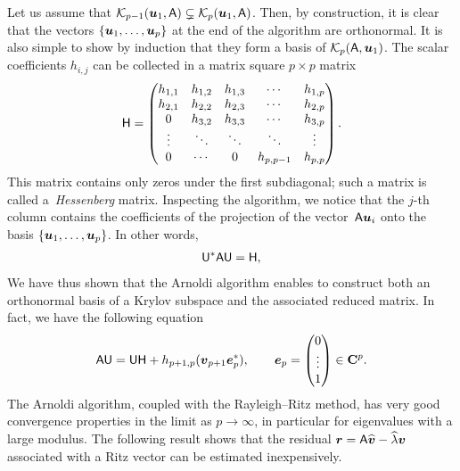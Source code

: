 Let us assume that $\mathcal K_{p-1}(\mathbf{\boldsymbol{u}}_1, \mathsf A) \subsetneq \mathcal K_p(\mathbf{\boldsymbol{u}}_1, \mathsf A)$.
Then, by construction,
it is clear that the vectors $\{\mathbf{\boldsymbol{u}}_1, \dotsc, \mathbf{\boldsymbol{u}}_p\}$ at the end of the algorithm are orthonormal.
It is also simple to show by induction that they form a basis of $\mathcal K_p(\mathsf A, \mathbf{\boldsymbol{u}}_1)$.
The scalar coefficients $h_{i,j}$ can be collected in a matrix square $p \times p$ matrix
\[
    \mathsf H
    =
    \begin{pmatrix}
        h_{1,1} & h_{1,2} & h_{1,3} & \cdots  & h_{1,p} \\
        h_{2,1} & h_{2,2} & h_{2,3} & \cdots  & h_{2,p} \\
        0       & h_{3,2} & h_{3,3} & \cdots  & h_{3,p} \\
        \vdots  & \ddots  & \ddots  & \ddots  & \vdots  \\
        0       & \cdots  & 0     & h_{p,p-1} & h_{p,p}
    \end{pmatrix}.
\]
This matrix contains only zeros under the first subdiagonal;
such a matrix is called a~\emph{Hessenberg} matrix.
Inspecting the algorithm,
we notice that the $j$-th column contains the coefficients of the projection of the vector~$\mathsf A \mathbf{\boldsymbol{u}}_i$ onto the basis $\{\mathbf{\boldsymbol{u}}_1, \dotsc, \mathbf{\boldsymbol{u}}_p\}$.
In other words,
\begin{align}
    \label{eq:reduced_matrix_arnoldi}
    \mathsf U^* \mathsf A \mathsf U = \mathsf H,
\end{align}
We have thus shown that the Arnoldi algorithm enables to construct both an orthonormal basis of a Krylov subspace and
the associated reduced matrix.
In fact, we have the following equation
\begin{equation}
    \label{eq:arnoldi_equation}
    \mathsf A \mathsf U = \mathsf U \mathsf H + h_{p+1,p} (\mathbf{\boldsymbol{v}}_{p+1} \mathbf{\boldsymbol{e}}_p^*),
    \qquad \mathbf{\boldsymbol{e}}_p = \begin{pmatrix} 0 \\ \vdots \\ 1 \end{pmatrix} \in \mathbf C^p.
\end{equation}
The Arnoldi algorithm, coupled with the Rayleigh--Ritz method,
has very good convergence properties in the limit as $p \to \infty$,
in particular for eigenvalues with a large modulus.
The following result shows that the residual $\mathbf{\boldsymbol{r}} = \mathsf A \widehat{\mathbf{\boldsymbol{v}}} - \widehat \lambda \mathbf{\boldsymbol{v}}$
associated with a Ritz vector can be estimated inexpensively.
